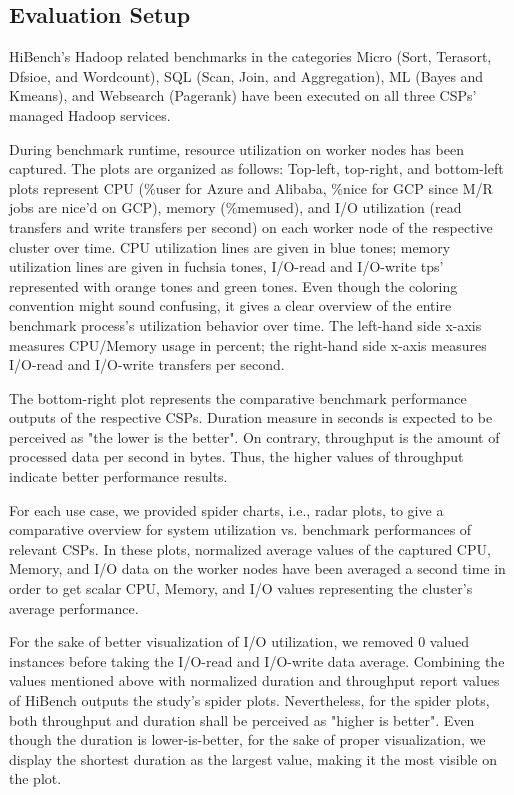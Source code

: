 \documentclass[review]{elsarticle}
\begin{document}
	
	\subsection{Evaluation Setup}
	HiBench's Hadoop related benchmarks in the categories Micro (Sort, Terasort, Dfsioe, and Wordcount), SQL (Scan, Join, and Aggregation), ML (Bayes and Kmeans), and Websearch (Pagerank) have been executed on all three CSPs' managed Hadoop services. 
	
	During benchmark runtime, resource utilization on worker nodes has been captured. The plots are organized as follows: Top-left, top-right, and bottom-left plots represent CPU (\%user for Azure and Alibaba, \%nice for GCP since M/R jobs are nice'd on GCP), memory (\%memused), and I/O utilization (read transfers and write transfers per second) on each worker node of the respective cluster over time. CPU utilization lines are given in blue tones; memory utilization lines are given in fuchsia tones, I/O-read and I/O-write tps' represented with orange tones and green tones. Even though the coloring convention might sound confusing, it gives a clear overview of the entire benchmark process's utilization behavior over time. The left-hand side x-axis measures CPU/Memory usage in percent; the right-hand side x-axis measures I/O-read and I/O-write transfers per second. 
	
	The bottom-right plot represents the comparative benchmark performance outputs of the respective CSPs. Duration measure in seconds is expected to be perceived as "the lower is the better". On contrary, throughput is the amount of processed data per second in bytes. Thus, the higher values of throughput indicate better performance results.
	
	For each use case, we provided spider charts, i.e., radar plots, to give a comparative overview for system utilization vs. benchmark performances of relevant CSPs. In these plots, normalized average values of the captured CPU, Memory, and I/O data on the worker nodes have been averaged a second time in order to get scalar CPU, Memory, and I/O values representing the cluster's average performance. 
	
	For the sake of better visualization of I/O utilization, we removed 0 valued instances before taking the I/O-read and I/O-write data average. Combining the values mentioned above with normalized duration and throughput report values of HiBench outputs the study's spider plots. Nevertheless, for the spider plots, both throughput and duration shall be perceived as "higher is better". Even though the duration is lower-is-better, for the sake of proper visualization, we display the shortest duration as the largest value, making it the most visible on the plot. 
	
\end{document}
